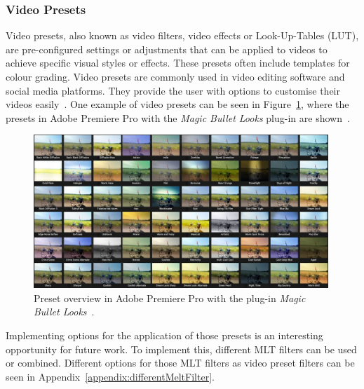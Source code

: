 \documentclass[../MasterThesis.tex]{subfiles}
\begin{document}
\subsubsection*{Video Presets}

Video presets, also known as video filters, video effects or Look-Up-Tables (LUT), are pre-configured settings or adjustments that can be applied to videos to achieve specific visual styles or effects. 
These presets often include templates for colour grading. 
Video presets are commonly used in video editing software and social media platforms. They provide the user with options to customise their videos easily~\cite{cc1}.
%
One example of video presets can be seen in Figure~\ref{figure:app}, where the presets in Adobe Premiere Pro with the \textit{Magic Bullet Looks} plug-in are shown~\cite{premierepro, magicbullet}.

\begin{figure}[H]
	
	\centering
	
	\includegraphics[width=0.99\textwidth]{app.jpg}
	
	\caption[Presets in Adobe Premiere Pro (\textit{Magic Bullet Looks}).]{Preset overview in Adobe Premiere Pro with the plug-in \textit{Magic Bullet Looks}~\cite{premierepro, magicbullet}.}
	\label{figure:app}
	
\end{figure}

Implementing options for the application of those presets is an interesting opportunity for future work. To implement this, different MLT filters can be used or combined. Different options for those MLT filters as video preset filters can be seen in Appendix~\ref{appendix:differentMeltFilter}.
\end{document}
